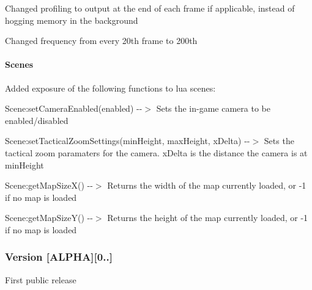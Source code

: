 \begin{DoxyItemize}
\item Changed profiling to output at the end of each frame if applicable, instead of hogging memory in the background
\item Changed frequency from every 20th frame to 200th \paragraph*{Scenes}
\end{DoxyItemize}


\begin{DoxyItemize}
\item Added exposure of the following functions to lua scenes\+:
\begin{DoxyItemize}
\item Scene\+:set\+Camera\+Enabled(enabled) -\/-\/$>$ Sets the in-\/game camera to be enabled/disabled
\item Scene\+:set\+Tactical\+Zoom\+Settings(min\+Height, max\+Height, x\+Delta) -\/-\/$>$ Sets the tactical zoom paramaters for the camera. x\+Delta is the distance the camera is at min\+Height
\item Scene\+:get\+Map\+Size\+X() -\/-\/$>$ Returns the width of the map currently loaded, or -\/1 if no map is loaded
\item Scene\+:get\+Map\+Size\+Y() -\/-\/$>$ Returns the height of the map currently loaded, or -\/1 if no map is loaded
\end{DoxyItemize}
\end{DoxyItemize}

\subsubsection*{Version \mbox{[}A\+L\+P\+HA\mbox{]}\mbox{[}0..\mbox{]}}


\begin{DoxyItemize}
\item First public release 
\end{DoxyItemize}